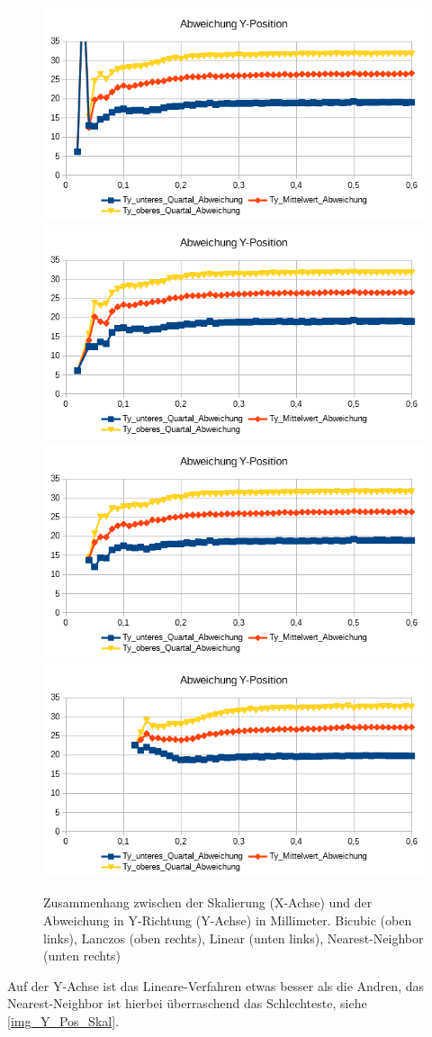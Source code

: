 \begin{figure}
	\centering
	\includegraphics[width=0.45\linewidth]{tabelle2/Y_Pos_Cubic}
	\includegraphics[width=0.45\linewidth]{tabelle2/Y_Pos_Lanc}
	\includegraphics[width=0.45\linewidth]{tabelle2/Y_Pos_Linear}
	\includegraphics[width=0.45\linewidth]{tabelle2/Y_Pos_NN}
	\caption{Zusammenhang zwischen der Skalierung (X-Achse) und der Abweichung in Y-Richtung (Y-Achse) in Millimeter. 
		Bicubic (oben links), Lanczos (oben rechts), Linear (unten links), Nearest-Neighbor (unten rechts)}
	\label{img_Y_Pos_Skal}
\end{figure}
Auf der Y-Achse ist das Lineare-Verfahren etwas besser als die Andren, das Nearest-Neighbor ist hierbei überraschend das Schlechteste, siehe \autoref{img_Y_Pos_Skal}.\\
